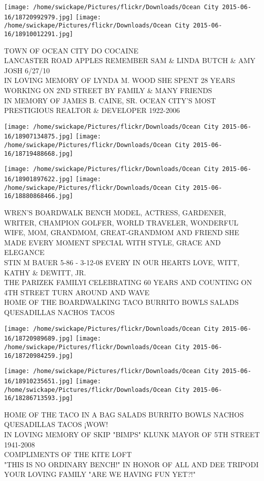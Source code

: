 \documentclass[10pt,letterpaper]{article}
\begin{document}
\texttt{[image: /home/swickape/Pictures/flickr/Downloads/Ocean City 2015-06-16/18720992979.jpg]}
\texttt{[image: /home/swickape/Pictures/flickr/Downloads/Ocean City 2015-06-16/18910012291.jpg]}

TOWN OF OCEAN CITY DO COCAINE\\
LANCASTER ROAD APPLES REMEMBER SAM \& LINDA BUTCH \& AMY JOSH 6/27/10\\
IN LOVING MEMORY OF LYNDA M. WOOD SHE SPENT 28 YEARS WORKING ON 2ND STREET BY FAMILY \& MANY FRIENDS\\
IN MEMORY OF JAMES B. CAINE, SR. OCEAN CITY'S MOST PRESTIGIOUS REALTOR \& DEVELOPER 1922{-}2006\\
\pagebreak

\texttt{[image: /home/swickape/Pictures/flickr/Downloads/Ocean City 2015-06-16/18907134875.jpg]}
\texttt{[image: /home/swickape/Pictures/flickr/Downloads/Ocean City 2015-06-16/18719488668.jpg]}

\texttt{[image: /home/swickape/Pictures/flickr/Downloads/Ocean City 2015-06-16/18901897622.jpg]}
\texttt{[image: /home/swickape/Pictures/flickr/Downloads/Ocean City 2015-06-16/18880868466.jpg]}

WREN'S BOARDWALK BENCH MODEL, ACTRESS, GARDENER, WRITER, CHAMPION GOLFER, WORLD TRAVELER, WONDERFUL WIFE, MOM, GRANDMOM, GREAT{-}GRANDMOM AND FRIEND SHE MADE EVERY MOMENT SPECIAL WITH STYLE, GRACE AND ELEGANCE\\
STIN M BAUER 5{-}86 {-} 3{-}12{-}08 EVERY IN OUR HEARTS LOVE, WITT, KATHY \& DEWITT, JR.\\
THE PARIZEK FAMILYI CELEBRATING 60 YEARS AND COUNTING ON 4TH STREET TURN AROUND AND WAVE\\
HOME OF THE BOARDWALKING TACO BURRITO BOWLS SALADS QUESADILLAS NACHOS TACOS\\
\pagebreak

\texttt{[image: /home/swickape/Pictures/flickr/Downloads/Ocean City 2015-06-16/18720989689.jpg]}
\texttt{[image: /home/swickape/Pictures/flickr/Downloads/Ocean City 2015-06-16/18720984259.jpg]}

\texttt{[image: /home/swickape/Pictures/flickr/Downloads/Ocean City 2015-06-16/18910235651.jpg]}
\texttt{[image: /home/swickape/Pictures/flickr/Downloads/Ocean City 2015-06-16/18286713593.jpg]}

HOME OF THE TACO IN A BAG SALADS BURRITO BOWLS NACHOS QUESADILLAS TACOS ¡WOW!\\
IN LOVING MEMORY OF SKIP "BIMPS" KLUNK MAYOR OF 5TH STREET 1941{-}2008\\
COMPLIMENTS OF THE KITE LOFT\\
"THIS IS NO ORDINARY BENCH!" IN HONOR OF ALL AND DEE TRIPODI YOUR LOVING FAMILY "ARE WE HAVING FUN YET?!"\\
\pagebreak
\end{document}
